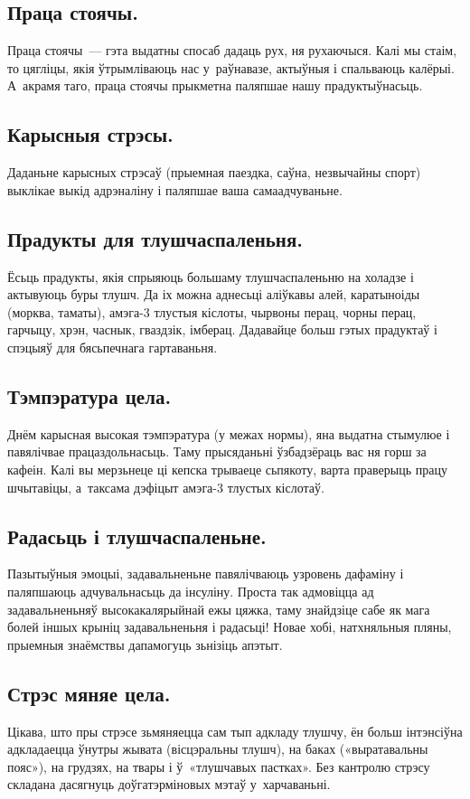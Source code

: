 \subsection{Праца стоячы.}
Праца стоячы~--- гэта выдатны спосаб дадаць рух, ня рухаючыся. Калі мы стаім, то цягліцы, якія ўтрымліваюць нас у~раўнавазе, актыўныя і спальваюць калёрыі. А~акрамя таго, праца стоячы прыкметна паляпшае нашу прадуктыўнасьць.

\subsection{Карысныя стрэсы.}
Даданьне карысных стрэсаў (прыемная паездка, саўна, незвычайны спорт) выклікае выкід адрэналіну і паляпшае ваша самаадчуваньне.

\subsection{Прадукты для тлушчаспаленьня.}
Ёсьць прадукты, якія спрыяюць большаму тлушчаспаленьню на холадзе і актывуюць буры тлушч. Да іх можна аднесьці аліўкавы алей, каратыноіды (морква, таматы), амэга-3 тлустыя кіслоты, чырвоны перац, чорны перац, гарчыцу, хрэн, часнык, гваздзік, імберац. Дадавайце больш гэтых прадуктаў і спэцыяў для бясьпечнага гартаваньня.

\subsection{Тэмпэратура цела.}
Днём карысная высокая тэмпэратура (у межах нормы), яна выдатна стымулюе і павялічвае працаздольнасьць. Таму прысяданьні ўзбадзёраць вас ня горш за кафеін. Калі вы мерзьнеце ці кепска трываеце сьпякоту, варта праверыць працу шчытавіцы, а~таксама дэфіцыт амэга-3 тлустых кіслотаў.

\subsection{Радасьць і тлушчаспаленьне.}
Пазытыўныя эмоцыі, задавальненьне павялічваюць узровень дафаміну і паляпшаюць адчувальнасьць да інсуліну. Проста так адмовіцца ад задавальненьняў высокакалярыйнай ежы цяжка, таму знайдзіце сабе як мага болей іншых крыніц задавальненьня і радасьці! Новае хобі, натхняльныя пляны, прыемныя знаёмствы дапамогуць зьнізіць апэтыт.

\subsection{Стрэс мяняе цела.}
Цікава, што пры стрэсе зьмяняецца сам тып адкладу тлушчу, ён больш інтэнсіўна адкладаецца ўнутры жывата (вісцэральны тлушч), на баках («выратавальны пояс»), на грудзях, на твары і ў~«тлушчавых пастках». Без кантролю стрэсу складана дасягнуць доўгатэрміновых мэтаў у~харчаваньні.

